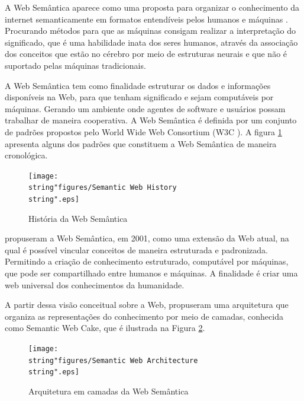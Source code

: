 A Web Semântica aparece como uma proposta para organizar o conhecimento
da internet semanticamente em formatos entendíveis pelos humanos e
máquinas \citep{bernerslee2001}. Procurando métodos para que as máquinas
consigam realizar a interpretação do significado, que é uma habilidade
inata dos seres humanos, através da associação dos conceitos que estão
no cérebro por meio de estruturas neurais e que não é suportado pelas
máquinas tradicionais.

A Web Semântica tem como finalidade estruturar os dados e informações
disponíveis na Web, para que tenham significado e sejam computáveis
por máquinas. Gerando um ambiente onde agentes de software e usuários
possam trabalhar de maneira cooperativa. A Web Semântica é definida
por um conjunto de padrões propostos pelo \foreignlanguage{english}{World
Wide Web Consortium} (W3C ).
A figura \ref{fig:Semantic_Web_History} apresenta alguns dos padrões
que constituem a Web Semântica de maneira cronológica.

\begin{figure}[H]
\begin{centering}
\texttt{[image: \\string"figures/Semantic Web History\\string".eps]}
\par\end{centering}
\caption{História da Web Semântica \label{fig:Semantic_Web_History}}

\end{figure}

\citet{bernerslee2001} propuseram a Web Semântica, em 2001, como
uma extensão da Web atual, na qual é possível vincular conceitos de
maneira estruturada e padronizada. Permitindo a criação de conhecimento
estruturado, computável por máquinas, que pode ser compartilhado entre
humanos e máquinas. A finalidade é criar uma web universal dos conhecimentos
da humanidade. 

A partir dessa visão conceitual sobre a Web, \citet{bernerslee2001}
propuseram uma arquitetura que organiza as representações do conhecimento
por meio de camadas, conhecida como \foreignlanguage{english}{Semantic
Web Cake,} que é ilustrada na Figura \ref{fig:Web-Semantic-Architecture}.

\begin{figure}[H]
\begin{centering}
\texttt{[image: \\string"figures/Semantic Web Architecture\\string".eps]}\caption{Arquitetura em camadas da Web Semântica\label{fig:Web-Semantic-Architecture}}
\par\end{centering}
\end{figure}

